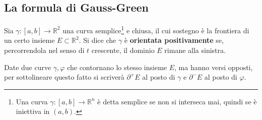 \documentclass[10pt, a4paper]{scrartcl}
\theoremstyle{definition}
\numberwithin{esempio}{section}
\theoremstyle{definition}
\numberwithin{obs}{section}
\numberwithin{nota}{section}
\numberwithin{equation}{subsection}
\begin{document}
\subsection{La formula di Gauss-Green}
Sia $\gamma:\left[ a,b \right] \to \mathbb{R}^2$ una curva semplice\footnote{Una curva $\gamma:\left[ a,b \right] \to \mathbb{R}^n$ \`e detta semplice se non si interseca mai, quindi se \`e iniettiva in $(a,b)$.} e chiusa, il cui sostegno \`e la frontiera di un certo insieme $E \subset \mathbb{R}^2$.
Si dice che $\gamma$ \`e \textbf{orientata positivamente} se, percorrendola nel senso di $t$ crescente, il dominio $E$ rimane alla sinistra.

Date due curve $\gamma, \varphi $ che contornano lo stesso insieme $E$, ma hanno versi opposti, per sottolineare questo fatto si scriver\`a $\partial ^+E$ al posto di $\gamma$ e $\partial ^- E$ al posto di $\varphi $.
\end{document}
